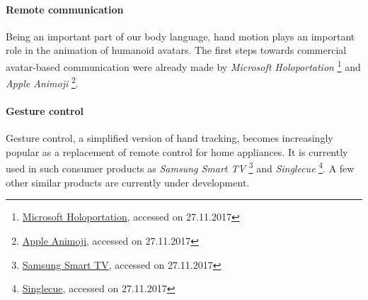 \paragraph{Remote communication} Being an important part of our body language, hand motion  plays an important role in the animation of humanoid avatars. The first steps towards commercial avatar-based communication were already made by 
%
\textit{Microsoft Holoportation}
\footnote{\href{https://www.microsoft.com/en-us/research/project/holoportation-3/}{Microsoft Holoportation}, accessed on 27.11.2017}
%
and \textit{Apple Animoji} 
\footnote{\href{https://support.apple.com/en-us/HT208190}{Apple Animoji}, accessed on 27.11.2017}.

\paragraph{Gesture control} Gesture control, a simplified version of hand tracking, becomes increasingly popular as a replacement of remote control for home appliances. It is currently used in such consumer products as 
%
\textit{Samsung Smart TV}
\footnote{\href{http://www.samsung.com/ph/smarttv/motion_control.html}{Samsung Smart TV}, accessed on 27.11.2017}
%
 and \textit{Singlecue}
 \footnote{\href{https://singlecue.com/}{Singlecue}, accessed on 27.11.2017}.
%
 A few other similar products are currently under development.


